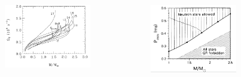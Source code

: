 \begin{frame}
\begin{columns}
\begin{column}{0.33\textwidth}
	\begin{figure}
		\centering
		\includegraphics[width=0.9\linewidth]{./images/ns-mass-omega_k.png}
	\end{figure}
\end{column}
\begin{column}{0.33\textwidth}
	\begin{figure}
		\centering
		\includegraphics[width=0.9\linewidth]{./images/ns-mass-p_min.png}
	\end{figure}
\end{column}
\begin{column}{0.33\textwidth}
	\begin{figure}
		\centering

\end{figure}
\end{column}
\end{columns}
\end{frame}
